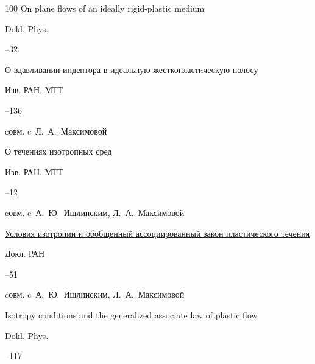 \begin{thebibliography}{100}
\paper On plane flows of an ideally rigid-plastic medium

\jour Dokl. Phys.




--32





\paper О вдавливании индентора в идеальную жесткопластическую полосу 

\jour Изв. РАН. МТТ



–136

\miscnote cовм. c~Л.~А.~Максимовой






\paper О течениях изотропных сред 

\jour Изв. РАН. МТТ



–12 

\miscnote cовм. c~А.~Ю.~Ишлинским, Л.~А.~Максимовой




\paper \href{http://mi.mathnet.ru/dan18209}{Условия изотропии и обобщенный ассоциированный закон пластического течения}

\jour Докл. РАН




--51


\miscnote cовм. c~А.~Ю.~Ишлинским, Л.~А.~Максимовой

\transl

\paper \linebreak Isotropy conditions and the generalized associate law of plastic flow

\jour Dokl. Phys. 




--117


\end{thebibliography}
